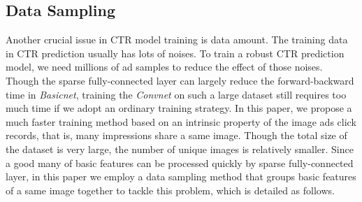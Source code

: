 \documentclass{sig-alternate}
\begin{document}
\subsection{Data Sampling}
Another crucial issue in CTR model training is data amount. The training data in CTR prediction usually has lots of noises. To train a robust CTR prediction model, we need  millions of ad samples to reduce the effect of those noises. Though the sparse fully-connected layer can largely reduce the forward-backward time in \emph{Basicnet}, training the \emph{Convnet} on such a large dataset still requires too much time if we adopt an ordinary training strategy. In this paper, we propose a much faster training method based on an intrinsic property of the image ads click records, that is, many impressions share a same image. Though the total size of the dataset is very large, the number of unique images is relatively smaller. Since a good many of basic features can be processed quickly by sparse fully-connected layer, in this paper we employ a data sampling method that groups basic features of a same image together to tackle this problem, which is detailed as follows.
\end{document}
